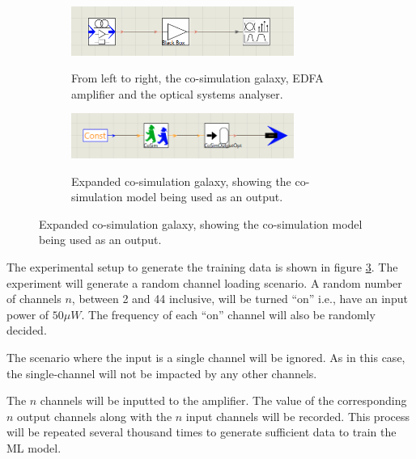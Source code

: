 \begin{figure}[h]
    \caption{Experimental setup in VPI. Figure \ref{fig:tw:top_lvl} shows the top level simulation. Figure \ref{fig:tw:co_sim_galaxy} shows the expanded co-simulation sub-module, referred to as a galaxy.}
    \begin{subfigure}{\textwidth}
        \centering
        \caption{From left to right, the co-simulation galaxy, EDFA amplifier and the optical systems analyser.}
        \includegraphics[width=0.8\textwidth]{images/technical_work/section_2_data generation/ex_setup.png}
        \label{fig:tw:top_lvl}
    \end{subfigure}
    \begin{subfigure}{\textwidth}
        \centering
        \caption{Expanded co-simulation galaxy, showing the co-simulation model being used as an output.}
        \includegraphics[width=0.8\textwidth]{images/technical_work/section_2_data generation/co_sim_galaxy.png} 
        \label{fig:tw:co_sim_galaxy}
    \end{subfigure}
    \label{fig:tw:exp_setup}
\end{figure}


The experimental setup to generate the training data is shown in figure \ref{fig:tw:exp_setup}. The experiment will generate a random channel loading scenario. A random number of channels $n$, between 2 and 44 inclusive, will be turned “on” i.e., have an input power of $50\mu W$. The frequency of each “on” channel will also be randomly decided. 

The scenario where the input is a single channel will be ignored. As in this case, the single-channel will not be impacted by any other channels.

The $n$ channels will be inputted to the amplifier. The value of the corresponding $n$ output channels along with the $n$ input channels will be recorded. This process will be repeated several thousand times to generate sufficient data to train the ML model. 

